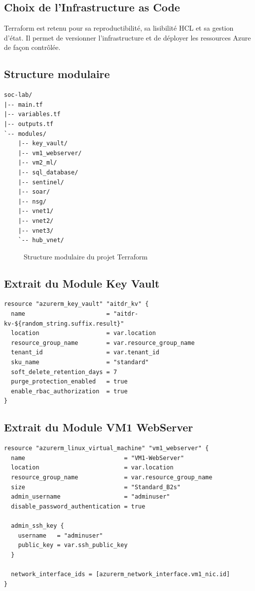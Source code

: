 \documentclass[11pt,a4paper]{report}
\newcommand{\placeholderfigure}[2]{%
\begin{figure}[H]
\centering
\fbox{\begin{minipage}{0.86\textwidth}
\centering
\vspace{0.8cm}
\textbf{[Insérer la Figure #1 ici]}
\vspace{0.8cm}
\end{minipage}}
\caption{#2}
\label{fig:#1}
\end{figure}
}
\begin{document}
\subsection{Choix de l'Infrastructure as Code}
Terraform est retenu pour sa reproductibilité, sa lisibilité HCL et sa gestion d'état. Il permet de versionner l'infrastructure et de déployer les ressources Azure de façon contrôlée.

\subsection{Structure modulaire}
\begin{lstlisting}[style=bashstyle, caption={Arborescence complète des modules Terraform}]
soc-lab/
|-- main.tf
|-- variables.tf
|-- outputs.tf
`-- modules/
    |-- key_vault/
    |-- vm1_webserver/
    |-- vm2_ml/
    |-- sql_database/
    |-- sentinel/
    |-- soar/
    |-- nsg/
    |-- vnet1/
    |-- vnet2/
    |-- vnet3/
    `-- hub_vnet/
\end{lstlisting}
\placeholderfigure{6.1}{Structure modulaire du projet Terraform}

\subsection{Extrait du Module Key Vault}
\begin{lstlisting}[style=hclstyle, caption={Module Key Vault}]
resource "azurerm_key_vault" "aitdr_kv" {
  name                       = "aitdr-kv-${random_string.suffix.result}"
  location                   = var.location
  resource_group_name        = var.resource_group_name
  tenant_id                  = var.tenant_id
  sku_name                   = "standard"
  soft_delete_retention_days = 7
  purge_protection_enabled   = true
  enable_rbac_authorization  = true
}
\end{lstlisting}

\subsection{Extrait du Module VM1 WebServer}
\begin{lstlisting}[style=hclstyle, caption={Module VM1 WebServer}]
resource "azurerm_linux_virtual_machine" "vm1_webserver" {
  name                            = "VM1-WebServer"
  location                        = var.location
  resource_group_name             = var.resource_group_name
  size                            = "Standard_B2s"
  admin_username                  = "adminuser"
  disable_password_authentication = true

  admin_ssh_key {
    username   = "adminuser"
    public_key = var.ssh_public_key
  }

  network_interface_ids = [azurerm_network_interface.vm1_nic.id]
}
\end{lstlisting}
\end{document}
